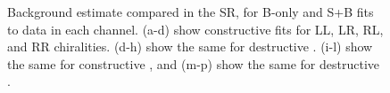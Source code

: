 {\begin{figure}[!htb]
\begin{center}
\caption{Background estimate compared in the SR, for B-only and S+B fits to data in each channel. (a-d) show constructive \ee fits for LL, LR, RL, and RR chiralities. (d-h) show the same for destructive \ee. (i-l) show the same for constructive \mm, and (m-p) show the same for destructive \mm.}
\label{fig:ciFuncBias}
\end{center}
\end{figure}
\clearpage
}


